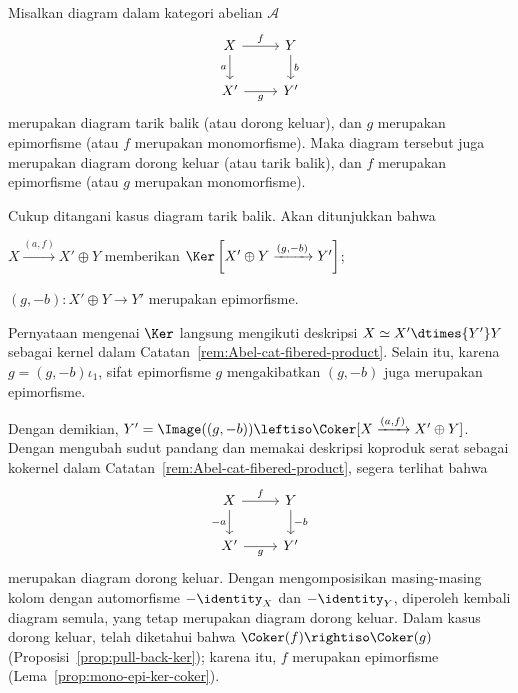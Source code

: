 \begin{proposisi}\label{prop:Abel-cat-pull-push}
	Misalkan diagram dalam kategori abelian $\mathcal{A}$
	\[\begin{tikzcd}
		X \arrow[r, "f"] \arrow[d, "a"'] & Y \arrow[d, "b"] \\
		X' \arrow[r, "g"'] & Y'
	\end{tikzcd}\]
	merupakan diagram tarik balik (atau dorong keluar), dan $g$ merupakan
	epimorfisme (atau $f$ merupakan monomorfisme). Maka diagram tersebut juga
	merupakan diagram dorong keluar (atau tarik balik), dan $f$ merupakan
	epimorfisme (atau $g$ merupakan monomorfisme).
\end{proposisi}
\begin{bukti}
	Cukup ditangani kasus diagram tarik balik. Akan ditunjukkan bahwa
	\begin{compactitem}
		\item $X \xrightarrow{(a, f)} X' \oplus Y$ memberikan
		$\Ker\left[ X' \oplus Y \xrightarrow{(g, -b)} Y' \right]$;
		\item $(g, -b): X' \oplus Y \to Y'$ merupakan epimorfisme.
	\end{compactitem}

	Pernyataan mengenai $\Ker$ langsung mengikuti deskripsi
	$X \simeq X' \dtimes{Y'} Y$ sebagai kernel dalam
	Catatan~\ref{rem:Abel-cat-fibered-product}. Selain itu, karena
	$g = (g, -b) \iota_1$, sifat epimorfisme $g$ mengakibatkan
	$(g, -b)$ juga merupakan epimorfisme.

	Dengan demikian,
	$Y' = \Image((g, -b)) \leftiso
	\Coker[X \xrightarrow{(a,f)} X' \oplus Y ]$. Dengan mengubah sudut pandang
	dan memakai deskripsi koproduk serat sebagai kokernel dalam
	Catatan~\ref{rem:Abel-cat-fibered-product}, segera terlihat bahwa
	\[\begin{tikzcd}
		X \arrow[r, "f"] \arrow[d, "-a"'] & Y \arrow[d, "-b"] \\
		X' \arrow[r, "g"'] & Y'
	\end{tikzcd}\]
	merupakan diagram dorong keluar. Dengan mengomposisikan masing-masing kolom
	dengan automorfisme $-\identity_X$ dan $-\identity_Y$,
	diperoleh kembali diagram semula, yang tetap merupakan diagram dorong
	keluar. Dalam kasus dorong keluar, telah diketahui bahwa
	$\Coker(f) \rightiso \Coker(g)$
	(Proposisi~\ref{prop:pull-back-ker}); karena itu, $f$ merupakan epimorfisme
	(Lema~\ref{prop:mono-epi-ker-coker}).
\end{bukti}


